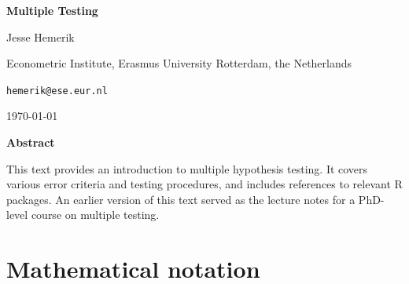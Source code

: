 \documentclass[11pt]{article}
\theoremstyle{plain}
\theoremstyle{definition}
\begin{document}


\begin{titlepage}

\centering

\vspace*{2cm}

{\huge\bfseries Multiple Testing\par}

\vspace{2cm}

{\Large Jesse Hemerik\par}

\vspace{0.3cm}

{\large Econometric Institute, Erasmus University Rotterdam, the Netherlands\par
\texttt{hemerik@ese.eur.nl}\par}

\vspace{1cm}

{\large \today\par}

\vspace{2cm}

\begin{minipage}{0.8\textwidth}
\small
\begin{center}
\textbf{Abstract}
\end{center}
This text provides an introduction to multiple hypothesis testing. 
It covers various error criteria and testing procedures, and includes references to relevant R packages.
An earlier version of this text served as the lecture notes for a PhD-level course on multiple testing.
\end{minipage}

\vfill

\end{titlepage}




\clearpage
\tableofcontents

\newpage

\section*{Mathematical notation}

\end{document}
